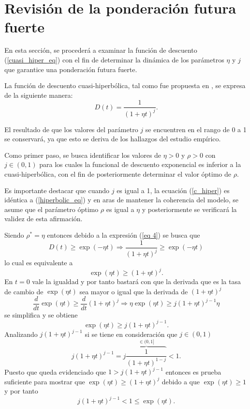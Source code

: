 \section{Revisión de la ponderación futura fuerte}
En esta sección, se procederá a examinar la función de descuento (\ref{cuasi_hiper_eq}) con el fin de determinar la dinámica de los parámetros $\eta$ y $j$ que garantice una ponderación futura fuerte.

La función de descuento cuasi-hiperbólica, tal como fue propuesta en \parencite{myerson1995discounting}, se expresa de la siguiente manera:
\begin{equation}
    \label{c_hiper}
    D(t)=\dfrac{1}{(1+\eta t)^j}.
\end{equation}

El resultado de que los valores del parámetro $j$ se encuentren en el rango de 0 a 1 se conservará, ya que esto se deriva de los hallazgos del estudio empírico.

Como primer paso, se busca identificar los valores de $\eta>0$ y $\rho>0$ con $j \in (0,1)$ para los cuales la funcional de descuento exponencial es inferior a la cuasi-hiperbólica, con el fin de posteriormente determinar el valor óptimo de $\rho$. 

Es importante destacar que cuando $j$ es igual a 1, la ecuación (\ref{c_hiper}) es idéntica a (\ref{hiperbolic_eq}) y en aras de mantener la coherencia del modelo, se asume que el parámetro óptimo $\rho$ es igual a $\eta$ y posteriormente se verificará la validez de esta afirmación.

Siendo $\rho^{\ast}=\eta$ entonces debido a la expresión (\ref{eq 4}) se busca que
\begin{equation}
\label{cap 5 condi exp}
    D(t) \geq \exp(-\eta t) \Rightarrow
\dfrac{1}{(1+\eta t)^j} \geq \exp(-\eta t)
\end{equation}
%
lo cual es equivalente a
$$\exp(\eta t) \geq (1+ \eta t)^j.$$
%
En $t=0$ vale la igualdad y por tanto bastará con que la derivada que es la tasa de cambio de $\exp(\eta t)$ sea mayor o igual que la derivada de  $(1+ \eta t)^j$
$$\dfrac{d}{dt}\exp(\eta t) \geq \dfrac{d}{dt} (1+ \eta t)^j \Rightarrow
\eta \exp(\eta t) \geq j (1+ \eta t)^{j-1} \eta $$
%
se simplifica y se obtiene
$$\exp(\eta t) \geq j (1+ \eta t)^{j-1}.$$
%
Analizando $j (1+ \eta t)^{j-1}$ si se tiene en consideración que $j \in (0,1)$
$$j (1+ \eta t)^{j-1}= j \overbrace{\dfrac{1}{(1+ \eta t)^{1-j}}}^{\in (0,1]} < 1.$$
%
Puesto que queda evidenciado que $1 > j (1+ \eta t)^{j-1}$ entonces es prueba suficiente para mostrar que $\exp(\eta t) \geq (1+ \eta t)^j$ debido a que 
$\exp(\eta t) \geq 1$ y por tanto
\begin{equation}
\label{eq sec 5.4}
j (1+ \eta t)^{j-1}<1 \leq \exp(\eta t) .
\end{equation}

